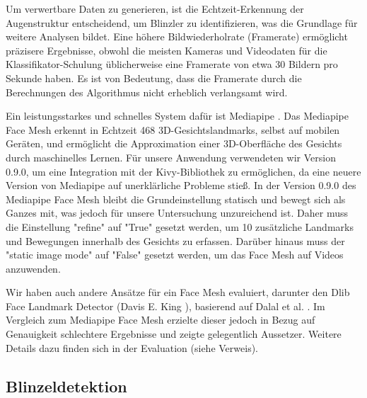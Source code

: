 Um verwertbare Daten zu generieren, ist die Echtzeit-Erkennung der Augenstruktur entscheidend, um Blinzler zu identifizieren, was die Grundlage für weitere Analysen bildet. Eine höhere Bildwiederholrate (Framerate) ermöglicht präzisere Ergebnisse, obwohl die meisten Kameras und Videodaten für die Klassifikator-Schulung üblicherweise eine Framerate von etwa 30 Bildern pro Sekunde haben. Es ist von Bedeutung, dass die Framerate durch die Berechnungen des Algorithmus nicht erheblich verlangsamt wird. 

Ein leistungsstarkes und schnelles System dafür ist Mediapipe \cite{LU19}. Das Mediapipe Face Mesh erkennt in Echtzeit 468 3D-Gesichtslandmarks, selbst auf mobilen Geräten, und ermöglicht die Approximation einer 3D-Oberfläche des Gesichts durch maschinelles Lernen. Für unsere Anwendung verwendeten wir Version 0.9.0, um eine Integration mit der Kivy-Bibliothek zu ermöglichen, da eine neuere Version von Mediapipe auf unerklärliche Probleme stieß. In der Version 0.9.0 des Mediapipe Face Mesh bleibt die Grundeinstellung statisch und bewegt sich als Ganzes mit, was jedoch für unsere Untersuchung unzureichend ist. Daher muss die Einstellung "refine" auf "True" gesetzt werden, um 10 zusätzliche Landmarks und Bewegungen innerhalb des Gesichts zu erfassen. Darüber hinaus muss der "static image mode" auf "False" gesetzt werden, um das Face Mesh auf Videos anzuwenden. 

Wir haben auch andere Ansätze für ein Face Mesh evaluiert, darunter den Dlib Face Landmark Detector (Davis E. King \cite{DLIB09}), basierend auf Dalal et al. \cite{DA05}. Im Vergleich zum Mediapipe Face Mesh erzielte dieser jedoch in Bezug auf Genauigkeit schlechtere Ergebnisse und zeigte gelegentlich Aussetzer. Weitere Details dazu finden sich in der Evaluation (siehe Verweis).

\subsection{Blinzeldetektion}
\label{sec:blinkdetection}

